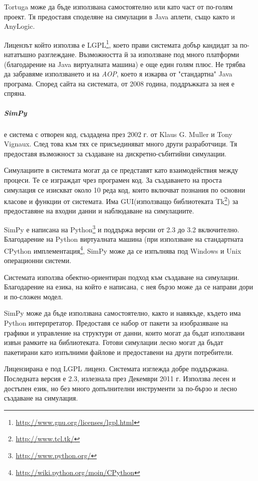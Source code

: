  			Tortuga може да бъде използвана самостоятелно или като част от по-голям проект. 
 			Тя предоставя споделяне на симулации в Java аплети, също както и AnyLogic.
 			
 			Лицензът който използва е \ac{LGPL}\footnote{\url{http://www.gnu.org/licenses/lgpl.html}}, 
 			което прави системата добър кандидат за по-нататъшно разглеждане.
 			Възможността й за използване под много платформи (благодарение на Java виртуалната машина) е 
 			още един голям плюс.
 			Не трябва да забравяме използването и на \emph{AOP}, което я изкарва от "стандартна" Java програма.
 			Според сайта на системата, от 2008 година, поддръжката за нея е спряна. \cite{Tortuga}
					
		\subparagraph{SimPy} е система с отворен код, създадена през 2002 г. от Klaus G. Muller и Tony Vignaux. След това
			към тях се присъединяват много други разработчици. 
			Тя предоставя възможност за създаване на дискретно-събитийни симулации.
			
			Симулациите в системата могат да се представят като взаимодействия между процеси. Те се изграждат чрез
			програмен код. За създаването на проста симулация се изискват около 10 реда код, 
			които включват познания по основни класове и функции от системата. Има GUI(използващо библиотеката 
			Tk\footnote{\url{http://www.tcl.tk/}}) за предоставяне на входни данни и наблюдаване на симулациите.						
		
			SimPy е написана на Python\footnote{\url{http://www.python.org/}} и поддържа версии от 2.3 до 3.2 включително.
			Благодарение на Python виртуалната машина (при използване на стандартната CPython 
			имплементация\footnote{\url{http://wiki.python.org/moin/CPython}}, SimPy може да се изпълнява под 
			Windows и Unix операционни системи.
		
			Системата използва обектно-ориентиран подход към създаване на симулации. Благодарение на езика, на който е
			написана, с нея бързо може да се направи дори и по-сложен модел.
								
			SimPy може да бъде използвана самостоятелно, както и навякъде, където има Python интерпретатор.
			Предоставя се набор от пакети за изобразяване на графики и управление на структури от данни, които могат
			да бъдат използвани извън рамките на библиотеката. Готови симулации лесно могат да бъдат пакетирани
			като изпълними файлове и предоставени на други потребители.

				Лицензирана е под \ac{LGPL} лиценз. Системата изглежда добре поддържана. Последната версия е 2.3, излезнала през 
			Декември 2011 г. Използва лесен и достъпен език, но без много допълнителни инструменти за по-бързо и лесно
			създаване на симулация. \cite{SimPy}
				
